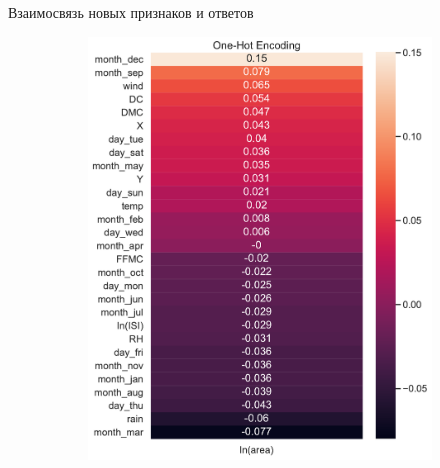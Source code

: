 \documentclass{beamer} %
\begin{document}
    \begin{frame}{Взаимосвязь новых признаков и ответов}
        \begin{figure}
            \centering
            \begin{subfigure}[b]{0.475\textwidth}
                \centering
                \includegraphics[width=\textwidth]{features_corr_oh_1.pdf}
            \end{subfigure}
            \hfill
            \begin{subfigure}[b]{0.475\textwidth}  
                \centering 

\end{subfigure}
\end{figure}
\end{frame}
\end{document}
